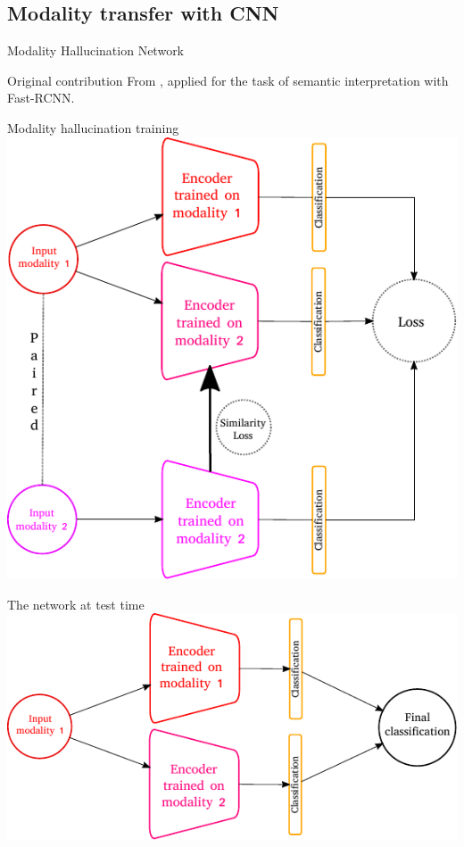 \subsection{Modality transfer with CNN}

\label{sec:modality_transfer}

\begin{frame}{Modality Hallucination Network}
	\begin{block}{Original contribution}
		From \cite{Hoffman2016}, applied for the task of semantic interpretation with Fast-RCNN.
	\end{block}
	\vfill	
	\begin{minipage}[c]{0.49\linewidth}
		\begin{block}{Modality hallucination training}
			\includegraphics[width=0.9\linewidth]{vect/hallucination.pdf}					
		\end{block}
	\end{minipage}
	\begin{minipage}[c]{0.49\linewidth}
		\begin{block}{The network at test time}
			\includegraphics[width=0.9\linewidth]{vect/hallucination_testing.pdf}	
		\end{block}
	\end{minipage}
\end{frame}

